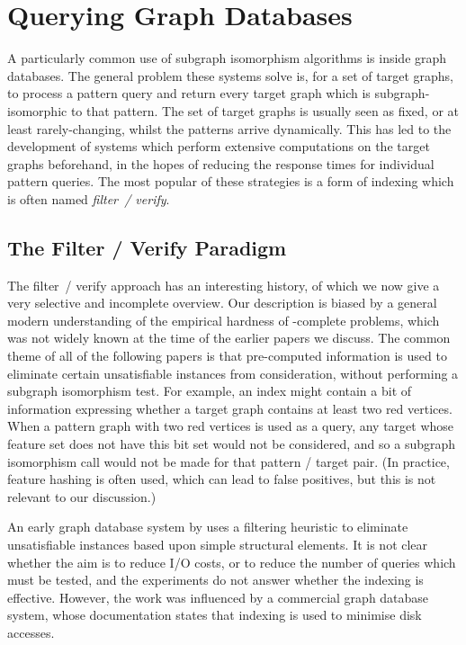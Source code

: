 \documentclass[twoside,11pt]{article}
\newcommand{\citet}[1]{\citeA{#1}}
\newcommand{\citep}[1]{\cite{#1}}
\begin{document}
\section{Querying Graph Databases}\label{section:filterverify}

A particularly common use of subgraph isomorphism algorithms is inside graph databases.  The
general problem these systems solve is, for a set of target graphs, to process a pattern query and
return every target graph which is subgraph-isomorphic to that pattern. The set of target graphs is
usually seen as fixed, or at least rarely-changing, whilst the patterns arrive dynamically. This has
led to the development of systems which perform extensive computations on the target graphs
beforehand, in the hopes of reducing the response times for individual pattern queries. The most
popular of these strategies is a form of indexing which is often named \emph{filter~/ verify}.

\subsection{The Filter / Verify Paradigm}

The filter~/ verify approach has an interesting history, of which we now give a very selective and
incomplete overview. Our description is biased by a general modern understanding of the empirical
hardness of \NP-complete problems, which was not widely known at the time of the earlier
papers we discuss. The common theme of all of the following papers is that pre-computed information
is used to eliminate certain unsatisfiable instances from consideration, without performing a
subgraph isomorphism test. For example, an index might contain a bit of information expressing
whether a target graph contains at least two red vertices. When a pattern graph with two red
vertices is used as a query, any target whose feature set does not have this bit set would not be
considered, and so a subgraph isomorphism call would not be made for that pattern / target pair. (In
practice, feature hashing is often used, which can lead to false positives, but this is not relevant
to our discussion.)

An early graph database system by \citet{DBLP:conf/pods/ShashaWG02} uses a filtering heuristic to
eliminate unsatisfiable instances based upon simple structural elements. It is not clear whether the
aim is to reduce I/O costs, or to reduce the number of queries which must be tested, and the
experiments do not answer whether the indexing is effective. However, the work was influenced by a commercial
graph database system, whose documentation \citep{o:Daylight} states that indexing is
used to minimise disk accesses.
\end{document}
